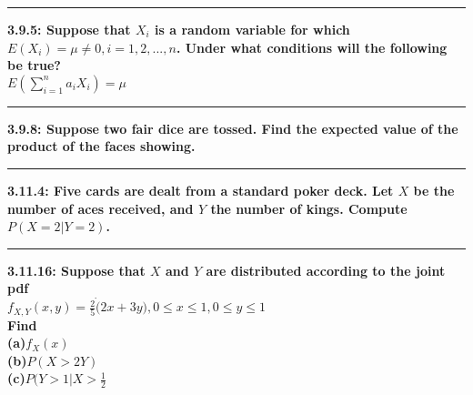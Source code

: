 \documentclass[11pt]{article}
\newcommand\question[2]{\vspace{.25in}\hrule\textbf{#1: #2}\vspace{.5em}\vspace{.10in}}
\renewcommand\part[1]{\vspace{.10in}\textbf{(#1)}}
\begin{document}
\question{3.9.5}
{Suppose that $X_{i}$ is a random variable for which 
$E(X_{i}) = \mu \neq 0,i=1,2,...,n$. Under what conditions will the following
be true?\\
$E(\sum_{i=1}^{n} a_{i} X_{i}) = \mu$}


\question{3.9.8}
{Suppose two fair dice are tossed. Find the expected value of the product of the
faces showing.}


\question{3.11.4}
{Five cards are dealt from a standard poker deck. Let $X$ be the number of aces
received, and $Y$ the number of kings. Compute $P(X = 2|Y=2)$.}


\question{3.11.16}
{Suppose that $X$ and $Y$ are distributed according to the joint pdf \\
$f_{X,Y}(x,y) = \frac{2}{5} \dot (2x + 3y), 0 \leq x\leq 1, 0 \leq y \leq 1$ \\
Find
}
\\

\part{a}{$f_X(x)$}
\\
\part{b}{$P(X>2Y)$}
\\
\part{c}{$P(Y>1|X>\frac{1}{2}$}
\end{document}
